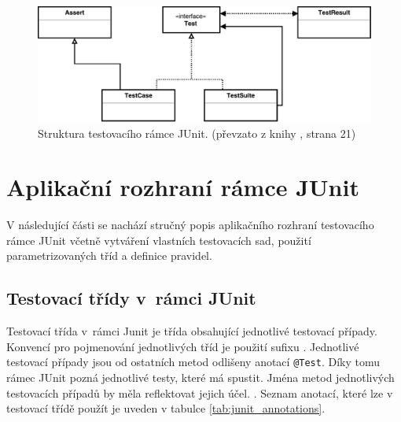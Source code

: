     \begin{figure}
      \includegraphics[width=\textwidth, center]{obrazky-figures/junit_arch.pdf}
      \caption{Struktura testovacího rámce JUnit. (převzato z knihy \cite{JUnitGuide}, strana 21)}
      \label{fig:junit_arch}
    \end{figure}


  \section{Aplikační rozhraní rámce JUnit}
  V následující části se nachází stručný popis aplikačního rozhraní testovacího rámce JUnit včetně vytváření vlastních testovacích sad, použití parametrizovaných tříd a definice pravidel.

    \subsection{Testovací třídy v~rámci JUnit}
    Testovací třída v~rámci Junit je třída obsahující jednotlivé testovací případy. Konvencí pro pojmenování jednotlivých tříd je použití sufixu . Jednotlivé testovací případy jsou od ostatních metod odlišeny anotací \texttt{@Test}. Díky tomu rámec JUnit pozná jednotlivé testy, které má spustit. Jména metod jednotlivých testovacích případů by měla reflektovat jejich účel.  \cite{vogella:JUnit}. Seznam anotací, které lze v testovací třídě použít je uveden v tabulce \ref{tab:junit_annotations}. 

